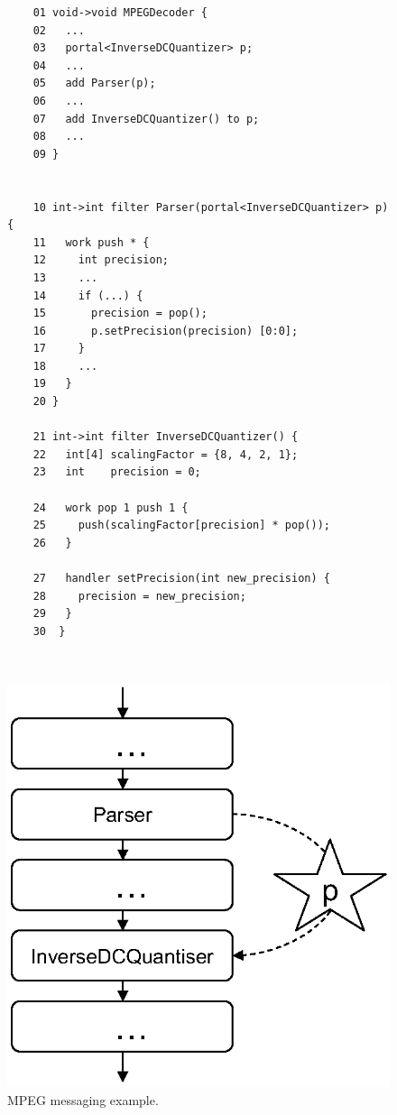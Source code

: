 \begin{figure}[t]
  \begin{minipage}[t]{3.8in}
    {
\vspace{-180pt}
  \begin{scriptsize}
    \begin{verbatim}
	01 void->void MPEGDecoder {
	02   ...
	03   portal<InverseDCQuantizer> p;
	04   ...
	05   add Parser(p);
	06   ...
	07   add InverseDCQuantizer() to p;
	08   ...
	09 }


	10 int->int filter Parser(portal<InverseDCQuantizer> p) {
	11   work push * {
	12     int precision;
	13     ...
	14     if (...) {
	15       precision = pop();
	16       p.setPrecision(precision) [0:0];
	17     }
	18     ...
	19   }
	20 }

	21 int->int filter InverseDCQuantizer() {
	22   int[4] scalingFactor = {8, 4, 2, 1};
	23   int    precision = 0;

	24   work pop 1 push 1 {
	25     push(scalingFactor[precision] * pop());
	26   }

	27   handler setPrecision(int new_precision) {
	28     precision = new_precision;
	29   }
	30  }
    \end{verbatim}
  \end{scriptsize}
   \vspace{-3pt}
}
\end{minipage}
  ~~\vrule~~
  \begin{minipage}[t]{2.8in}
    {
 	\includegraphics[scale=.9, angle=0]{./messaging_example_fig.eps}

    }
\end{minipage}
  \caption{MPEG messaging example.}
  \label{fig:messaging}
   \end{figure}

